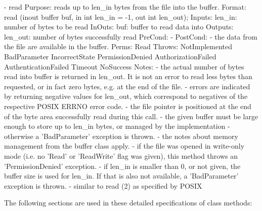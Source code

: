    \begin{mysmallspec}
    - read
      Purpose:  reads up to len_in bytes from the file into
                the buffer.
      Format:   read               (inout buffer      buf,
                                    in    int         len_in = -1,
                                    out   int         len_out);
      Inputs:   len_in:             number of bytes to be read
      InOuts:   buf:                buffer to read data into
      Outputs:  len_out:            number of bytes successfully 
                                    read
      PreCond:  -
      PostCond: - the data from the file are available in the
                  buffer.
      Perms:    Read
      Throws:   NotImplemented
                BadParameter
                IncorrectState
                PermissionDenied
                AuthorizationFailed
                AuthenticationFailed
                Timeout
                NoSuccess
      Notes:    - the actual number of bytes read into buffer
                  is returned in len_out.  It is not an error
                  to read less bytes than requested, or in fact
                  zero bytes, e.g. at the end of the file.
                - errors are indicated by returning negative
                  values for len_out, which correspond to
                  negatives of the respective POSIX ERRNO error
                  code.
                - the file pointer is positioned at the end of
                  the byte area successfully read during this 
                  call.
                - the given buffer must be large enough to
                  store up to len_in bytes, or managed by the
                  implementation - otherwise a 'BadParameter'
                  exception is thrown.
                - the notes about memory management from the
                  buffer class apply.
                - if the file was opened in write-only mode (i.e.
                  no 'Read' or 'ReadWrite' flag was given), this
                  method throws an 'PermissionDenied' exception.
                - if len_in is smaller than 0, or not given, 
                  the buffer size is used for len_in.
                  If that is also not available, a
                  'BadParameter' exception is thrown.
                - similar to read (2) as specified by POSIX
   \end{mysmallspec}
   \newpage

    The following sections are used in these detailed
    specifications of class methods:

